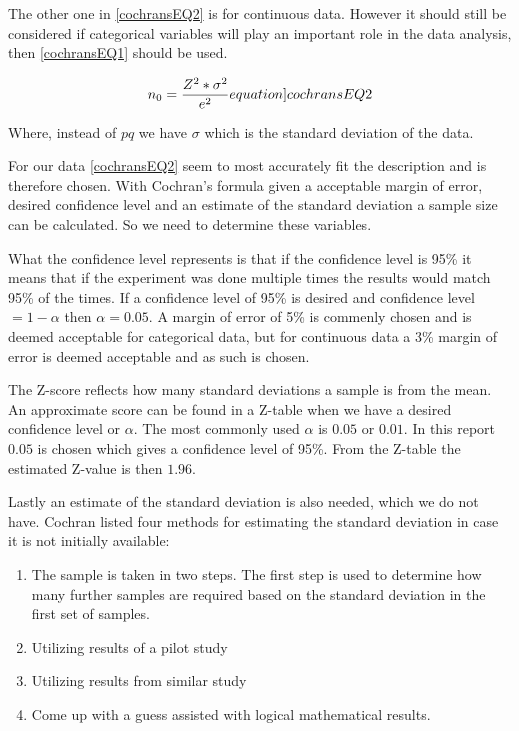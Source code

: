 The other one in \cref*{cochransEQ2} is for continuous data. However it should still be considered if categorical variables will play an important role in the data analysis, then \cref*{cochransEQ1} should be used.

\begin{equation}
    n_0 = \frac{Z^2*\sigma^2}{e^2}
    \label[equation]{cochransEQ2}
\end{equation}

Where, instead of $pq$ we have $\sigma$ which is the standard deviation of the data.




For our data \cref*{cochransEQ2} seem to most accurately fit the description and is therefore chosen. With Cochran's formula given a acceptable margin of error, desired confidence level and an estimate of the standard deviation a sample size can be calculated. So we need to determine these variables. 

What the confidence level  represents is that if the confidence level is 95\% it means that if the experiment was done multiple times the results would match 95\% of the times. If a confidence level of 95\% is desired and confidence level $= 1 - \alpha$ then $\alpha = 0.05$. 
A margin of error of 5\% is commenly chosen and is deemed acceptable for categorical data, but for continuous data a 3\% margin of error is deemed acceptable\cite{kotrlik2001organizational} and as such is chosen.

The Z-score reflects how many standard deviations a sample is from the mean. An approximate score can be found in a Z-table when we have a desired confidence level or $\alpha$. The most commonly used $\alpha$ is $0.05$ or $0.01$.\cite{kotrlik2001organizational} In this report $0.05$ is chosen which gives a confidence level of 95\%. From the Z-table the estimated Z-value is then $1.96$. 

Lastly an estimate of the standard deviation is also needed, which we do not have. Cochran listed four methods for estimating the standard deviation in case it is not initially available:
\begin{enumerate}
    \item The sample is taken in two steps. The first step is used to determine how many further samples are required based on the standard deviation in the first set of samples.
    \item Utilizing results of a pilot study
    \item Utilizing results from similar study
    \item Come up with a guess assisted with logical mathematical results.
\end{enumerate}


